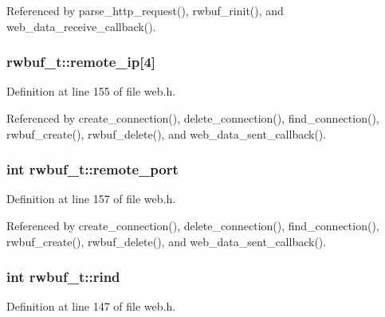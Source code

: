 Referenced by parse\-\_\-http\-\_\-request(), rwbuf\-\_\-rinit(), and web\-\_\-data\-\_\-receive\-\_\-callback().

\hypertarget{structrwbuf__t_ad83926198e358ac1a569b0da7749572c}{
\subsubsection[{remote\-\_\-ip}]{ rwbuf\-\_\-t\-::remote\-\_\-ip\mbox{[}4\mbox{]}}}\label{structrwbuf__t_ad83926198e358ac1a569b0da7749572c}


Definition at line 155 of file web.\-h.



Referenced by create\-\_\-connection(), delete\-\_\-connection(), find\-\_\-connection(), rwbuf\-\_\-create(), rwbuf\-\_\-delete(), and web\-\_\-data\-\_\-sent\-\_\-callback().

\hypertarget{structrwbuf__t_aace1e79a985cc8fab4c2093208bf3763}{
\subsubsection[{remote\-\_\-port}]{\setlength{\rightskip}{0pt plus 5cm}int rwbuf\-\_\-t\-::remote\-\_\-port}}\label{structrwbuf__t_aace1e79a985cc8fab4c2093208bf3763}


Definition at line 157 of file web.\-h.



Referenced by create\-\_\-connection(), delete\-\_\-connection(), find\-\_\-connection(), rwbuf\-\_\-create(), rwbuf\-\_\-delete(), and web\-\_\-data\-\_\-sent\-\_\-callback().

\hypertarget{structrwbuf__t_ad5cbf7a78a5f5d9aa75b38f90e0fb6af}{
\subsubsection[{rind}]{\setlength{\rightskip}{0pt plus 5cm}int rwbuf\-\_\-t\-::rind}}\label{structrwbuf__t_ad5cbf7a78a5f5d9aa75b38f90e0fb6af}


Definition at line 147 of file web.\-h.



